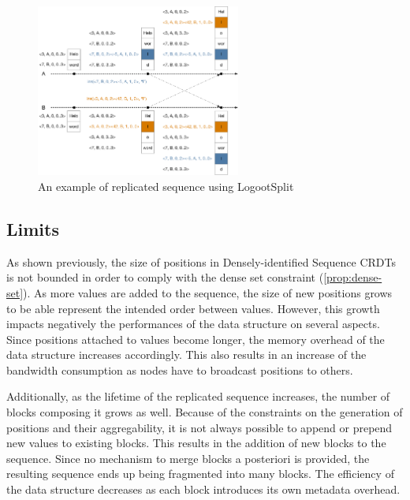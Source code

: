 \documentclass{article}
\theoremstyle{definition}
\newcounter{note-counter}
\theoremstyle{definition}
\theoremstyle{definition}
\theoremstyle{definition}
\begin{document}
\begin{figure}
    \centering
        \includegraphics[width=0.6\textwidth]{img/logootsplit-seq.pdf}
    \caption{An example of replicated sequence using LogootSplit}
    \label{fig:logootsplit-example}
\end{figure}


\subsection{Limits}

As shown previously, the size of positions in Densely-identified Sequence \acp{CRDT} is not bounded in order to comply with the dense set constraint (\autoref{prop:dense-set}).
As more values are added to the sequence, the size of new positions grows to be able represent the intended order between values.
However, this growth impacts negatively the performances of the data structure on several aspects.
Since positions attached to values become longer, the memory overhead of the data structure increases accordingly.
This also results in an increase of the bandwidth consumption as nodes have to broadcast positions to others.

Additionally, as the lifetime of the replicated sequence increases, the number of blocks composing it grows as well.
Because of the constraints on the generation of positions and their aggregability, it is not always possible to append or prepend new values to existing blocks.
This results in the addition of new blocks to the sequence.
Since no mechanism to merge blocks a posteriori is provided, the resulting sequence ends up being fragmented into many blocks.
The efficiency of the data structure decreases as each block introduces its own metadata overhead.
\end{document}
